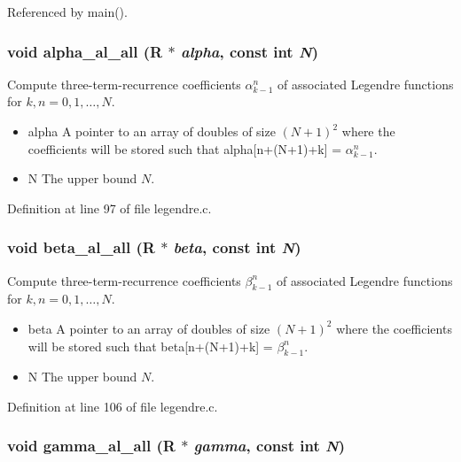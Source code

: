 Referenced by main().\hypertarget{group__nfsft_g6b01d5f2e8b3a026906e977118d7b0d2}{
\subsubsection{\setlength{\rightskip}{0pt plus 5cm}void alpha\_\-al\_\-all (R $\ast$ {\em alpha}, const int {\em N})}}
\label{group__nfsft_g6b01d5f2e8b3a026906e977118d7b0d2}


Compute three-term-recurrence coefficients $\alpha_{k-1}^n$ of associated Legendre functions for $k,n = 0,1,\ldots,N$. 

\begin{itemize}
\item alpha A pointer to an array of doubles of size $(N+1)^2$ where the coefficients will be stored such that alpha\mbox{[}n+(N+1)+k\mbox{]} = $\alpha_{k-1}^n$. \item N The upper bound $N$. \end{itemize}


Definition at line 97 of file legendre.c.\hypertarget{group__nfsft_gf0fb6a3993b3c956bea8fa75e3a71290}{
\subsubsection{\setlength{\rightskip}{0pt plus 5cm}void beta\_\-al\_\-all (R $\ast$ {\em beta}, const int {\em N})}}
\label{group__nfsft_gf0fb6a3993b3c956bea8fa75e3a71290}


Compute three-term-recurrence coefficients $\beta_{k-1}^n$ of associated Legendre functions for $k,n = 0,1,\ldots,N$. 

\begin{itemize}
\item beta A pointer to an array of doubles of size $(N+1)^2$ where the coefficients will be stored such that beta\mbox{[}n+(N+1)+k\mbox{]} = $\beta_{k-1}^n$. \item N The upper bound $N$. \end{itemize}


Definition at line 106 of file legendre.c.\hypertarget{group__nfsft_g88de851c8f9a4c042ad101cb4fb8c51d}{
\subsubsection{\setlength{\rightskip}{0pt plus 5cm}void gamma\_\-al\_\-all (R $\ast$ {\em gamma}, const int {\em N})}}
\label{group__nfsft_g88de851c8f9a4c042ad101cb4fb8c51d}



